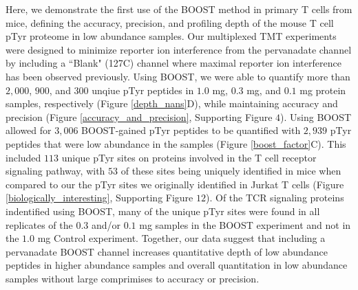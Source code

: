 \documentclass[journal=jprobs,manuscript=article]{achemso}
\begin{document}
 Here, we demonstrate the first use of the BOOST method in primary T cells from mice, defining the accuracy, precision, and profiling depth of the mouse T cell pTyr proteome in low abundance samples. Our multiplexed TMT experiments were designed to minimize reporter ion interference from the pervanadate channel by including a ``Blank" (127C) channel where maximal reporter ion interference has been observed previously\cite{chua2021ovalbumin,stopfer2021quantitative}. Using BOOST, we were able to quantify more than $2{,}000$, $900$, and $300$ unqiue pTyr peptides in $1.0$ mg, $0.3$ mg, and $0.1$ mg protein samples, respectively (Figure \ref{depth_nans}D), while maintaining accuracy and precision (Figure \ref{accuracy_and_precision}, Supporting Figure $4$). Using BOOST allowed for $3{,}006$ BOOST-gained pTyr peptides to be quantified with $2{,}939$ pTyr peptides that were low abundance in the samples (Figure \ref{boost_factor}C). This included $113$ unique pTyr sites on proteins involved in the T cell receptor signaling pathway, with $53$ of these sites being uniquely identified in mice when compared to our the pTyr sites we originally identified in Jurkat T cells (Figure \ref{biologically_interesting}, Supporting Figure $12$)\cite{chua2020tandem}. Of the TCR signaling proteins indentified using BOOST, many of the unique pTyr sites were found in all replicates of the $0.3$ and/or $0.1$ mg samples in the BOOST experiment and not in the $1.0$ mg Control experiment. Together, our data suggest that including a pervanadate BOOST channel increases quantitative depth of low abundance peptides in higher abundance samples and overall quantitation in low abundance samples without large comprimises to accuracy or precision.
\end{document}
